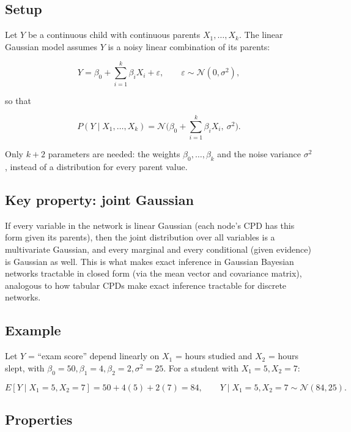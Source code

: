 \documentclass[11pt]{article}
\begin{document}
\subsection{Setup}

Let $Y$ be a continuous child with continuous parents $X_1, \dots, X_k$. The
linear Gaussian model assumes $Y$ is a noisy linear combination of its parents:

\[
Y = \beta_0 + \sum_{i=1}^{k} \beta_i X_i + \varepsilon, \qquad
\varepsilon \sim \mathcal{N}(0, \sigma^2),
\]

so that

\[
P(Y \mid X_1, \dots, X_k) = \mathcal{N}\!\Big(\beta_0 + \sum_{i=1}^k \beta_i X_i,\ \sigma^2\Big).
\]

Only $k+2$ parameters are needed: the weights $\beta_0, \dots, \beta_k$ and the
noise variance $\sigma^2$, instead of a distribution for every parent value.

\subsection{Key property: joint Gaussian}

If every variable in the network is linear Gaussian (each node's CPD has this
form given its parents), then the joint distribution over all variables is a
multivariate Gaussian, and every marginal and every conditional (given evidence)
is Gaussian as well. This is what makes exact inference in Gaussian Bayesian
networks tractable in closed form (via the mean vector and covariance matrix),
analogous to how tabular CPDs make exact inference tractable for discrete
networks.

\subsection{Example}

Let $Y$ = ``exam score'' depend linearly on $X_1$ = hours studied and
$X_2$ = hours slept, with $\beta_0 = 50, \beta_1 = 4, \beta_2 = 2, \sigma^2 = 25$.
For a student with $X_1 = 5, X_2 = 7$:

\[
E[Y \mid X_1=5, X_2=7] = 50 + 4(5) + 2(7) = 84,
\qquad Y \mid X_1=5, X_2=7 \sim \mathcal{N}(84, 25).
\]

\subsection{Properties}
\end{document}
